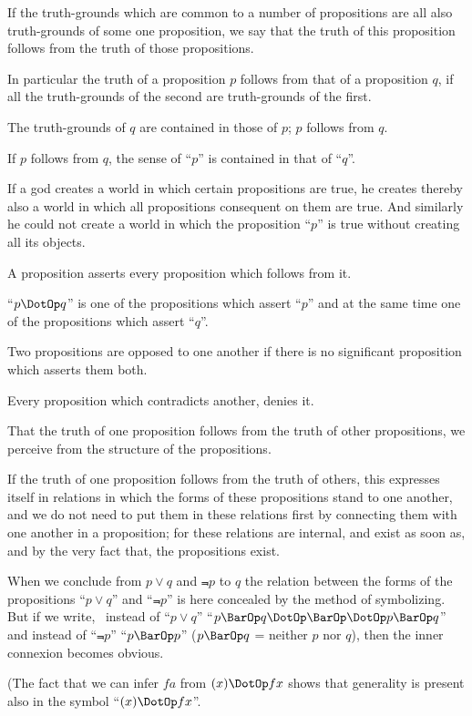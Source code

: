 {If the truth-grounds which are common to a
number of propositions are all also truth-grounds
of some one proposition, we say that the truth of
this proposition follows from the truth of those
propositions.}


{In particular the truth of a proposition $p$ follows
from that of a proposition $q$, if all the truth-grounds
of the second are truth-grounds of the
first.}


{The truth-grounds of $q$ are contained in those
of $p$; $p$ follows from $q$.}


{If $p$ follows from $q$, the sense of ``$p$'' is contained
in that of ``$q$''.}


{If a god creates a world in which certain propositions
are true, he creates thereby also a world
in which all propositions consequent on them are
true. And similarly he could not create a world
in which the proposition ``$p$'' is true without
creating all its objects.}


{A proposition asserts every proposition which
follows from it.}


{``$p \DotOp q$'' is one of the propositions which assert
``$p$'' and at the same time one of the propositions
which assert ``$q$''.

Two propositions are opposed to one another
if there is no significant proposition which asserts
them both.

Every proposition which contradicts another,
denies it.}


{That the truth of one proposition follows from
the truth of other propositions, we perceive from
the structure of the propositions.}


{If the truth of one proposition follows from the
truth of others, this expresses itself in relations in
which the forms of these propositions stand to one
another, and we do not need to put them in these
relations first by connecting them with one another
in a proposition; for these relations are internal,
and exist as soon as, and by the very fact that,
the propositions exist.}


{When we conclude from $p \lor q$ and $\Not{p}$ to $q$ the
relation between the forms of the propositions
``$p \lor q$'' and ``$\Not{p}$'' is here concealed by the method
of symbolizing. But if we write, \exempliGratia\ instead of
``$p \lor q$'' ``$p \BarOp q \DotOp \BarOp \DotOp p \BarOp q$'' and instead of ``$\Not{p}$''
``$p \BarOp p$'' ($p \BarOp q$ = neither $p$ nor $q$), then the inner
connexion becomes obvious.

(The fact that we can infer $fa$ from $(x) \DotOp fx$ shows
that generality is present also in the symbol
``$(x) \DotOp fx$''.}


